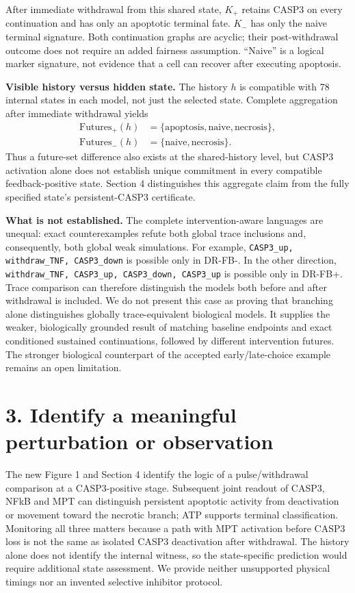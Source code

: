 \documentclass[11pt]{article}
\begin{document}
After immediate withdrawal from this shared state, $K_+$ retains CASP3 on
every continuation and has only an apoptotic terminal fate. $K_-$ has only
the naive terminal signature. Both continuation graphs are acyclic; their
post-withdrawal outcome does not require an added fairness assumption.
``Naive'' is a logical marker signature, not evidence that a cell can recover
after executing apoptosis.

\textbf{Visible history versus hidden state.} The history $h$ is compatible
with 78 internal states in each model, not just the selected state. Complete
aggregation after immediate withdrawal yields
\[
\begin{split}
\mathrm{Futures}_+(h)&=\{\mathrm{apoptosis},\mathrm{naive},\mathrm{necrosis}\},\\
\mathrm{Futures}_-(h)&=\{\mathrm{naive},\mathrm{necrosis}\}.
\end{split}
\]
Thus a future-set difference also exists at the shared-history level, but
CASP3 activation alone does not establish unique commitment in every compatible
feedback-positive state. Section 4 distinguishes this aggregate claim from
the fully specified state's persistent-CASP3 certificate.

\textbf{What is not established.} The complete intervention-aware languages
are unequal: exact counterexamples refute both global trace inclusions and,
consequently, both global weak simulations. For example,
\texttt{CASP3\_up, withdraw\_TNF, CASP3\_down} is possible only in DR-FB-.
In the other direction, \texttt{withdraw\_TNF, CASP3\_up, CASP3\_down,
CASP3\_up} is possible only in DR-FB+.
Trace comparison can therefore distinguish the models both before and after
withdrawal is included. We do not present this case as proving that branching alone
distinguishes globally trace-equivalent biological models. It supplies the
weaker, biologically grounded result of matching baseline endpoints and exact
conditioned sustained continuations, followed by different intervention
futures. The stronger biological counterpart of the accepted early/late-choice
example remains an open limitation.

\section*{3. Identify a meaningful perturbation or observation}

The new Figure 1 and Section 4 identify the logic of a pulse/withdrawal
comparison at a CASP3-positive stage. Subsequent joint readout of CASP3,
NFkB and MPT can distinguish persistent apoptotic activity from deactivation
or movement toward the necrotic branch; ATP supports terminal classification.
Monitoring all three matters because a path with MPT activation before CASP3
loss is not the same as isolated CASP3 deactivation after withdrawal.
The history alone does not identify the internal witness, so the state-specific
prediction would require additional state assessment. We provide neither
unsupported physical timings nor an invented selective inhibitor protocol.
\end{document}
